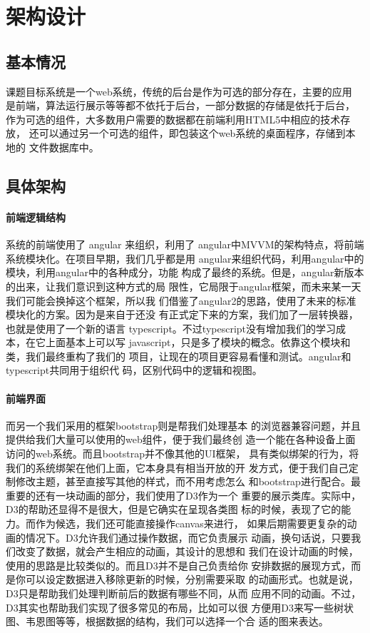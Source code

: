 \section{架构设计}
\subsection{基本情况}
课题目标系统是一个web系统，传统的后台是作为可选的部分存在，主要的应用
是前端，算法运行展示等等都不依托于后台，一部分数据的存储是依托于后台，
作为可选的组件，大多数用户需要的数据都在前端利用HTML5中相应的技术存放，
还可以通过另一个可选的组件，即包装这个web系统的桌面程序，存储到本地的
文件数据库中。
\subsection{具体架构}
\paragraph{前端逻辑结构} 系统的前端使用了 angular 来组织，利用了
angular中MVVM的架构特点，将前端系统模块化。在项目早期，我们几乎都是用
angular来组织代码，利用angular中的模块，利用angular中的各种成分，功能
构成了最终的系统。但是，angular新版本的出来，让我们意识到这种方式的局
限性，它局限于angular框架，而未来某一天我们可能会换掉这个框架，所以我
们借鉴了angular2的思路，使用了未来的标准模块化的方案。因为是来自于还没
有正式定下来的方案，我们加了一层转换器，也就是使用了一个新的语言
typescript。不过typescript没有增加我们的学习成本，在它上面基本上可以写
javascript，只是多了模块的概念。依靠这个模块和类，我们最终重构了我们的
项目，让现在的项目更容易看懂和测试。angular和typescript共同用于组织代
码，区别代码中的逻辑和视图。
\paragraph{前端界面} 而另一个我们采用的框架bootstrap则是帮我们处理基本
的浏览器兼容问题，并且提供给我们大量可以使用的web组件，便于我们最终创
造一个能在各种设备上面访问的web系统。而且bootstrap并不像其他的UI框架，
具有类似绑架的行为，将我们的系统绑架在他们上面，它本身具有相当开放的开
发方式，便于我们自己定制修改主题，甚至直接写其他的样式，而不用考虑怎么
和bootstrap进行配合。最重要的还有一块动画的部分，我们使用了D3作为一个
重要的展示类库。实际中，D3的帮助还显得不是很大，但是它确实在呈现各类图
标的时候，表现了它的能力。而作为候选，我们还可能直接操作canvas来进行，
如果后期需要更复杂的动画的情况下。D3允许我们通过操作数据，而它负责展示
动画，换句话说，只要我们改变了数据，就会产生相应的动画，其设计的思想和
我们在设计动画的时候，使用的思路是比较类似的。而且D3并不是自己负责给你
安排数据的展现方式，而是你可以设定数据进入移除更新的时候，分别需要采取
的动画形式。也就是说，D3只是帮助我们处理判断前后的数据有哪些不同，从而
应用不同的动画。不过，D3其实也帮助我们实现了很多常见的布局，比如可以很
方便用D3来写一些树状图、韦恩图等等，根据数据的结构，我们可以选择一个合
适的图来表达。
